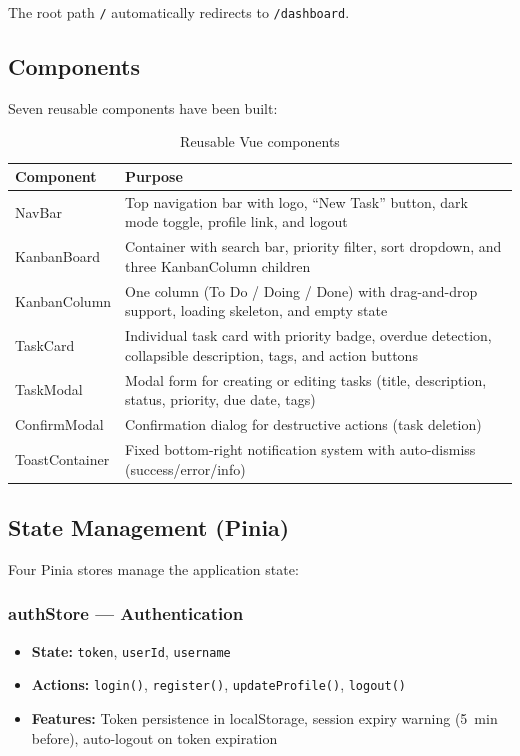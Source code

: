 \documentclass[12pt, a4paper]{article}
\begin{document}
The root path \texttt{/} automatically redirects to \texttt{/dashboard}.

\subsection{Components}

Seven reusable components have been built:

\begin{table}[H]
\centering
\begin{tabularx}{\textwidth}{lX}
\toprule
\textbf{Component} & \textbf{Purpose} \\
\midrule
NavBar         & Top navigation bar with logo, ``New Task'' button, dark mode toggle, profile link, and logout \\
KanbanBoard    & Container with search bar, priority filter, sort dropdown, and three KanbanColumn children \\
KanbanColumn   & One column (To Do / Doing / Done) with drag-and-drop support, loading skeleton, and empty state \\
TaskCard       & Individual task card with priority badge, overdue detection, collapsible description, tags, and action buttons \\
TaskModal      & Modal form for creating or editing tasks (title, description, status, priority, due date, tags) \\
ConfirmModal   & Confirmation dialog for destructive actions (task deletion) \\
ToastContainer & Fixed bottom-right notification system with auto-dismiss (success/error/info) \\
\bottomrule
\end{tabularx}
\caption{Reusable Vue components}
\end{table}

\subsection{State Management (Pinia)}

Four Pinia stores manage the application state:

\subsubsection{authStore --- Authentication}
\begin{itemize}[nosep]
    \item \textbf{State:} \texttt{token}, \texttt{userId}, \texttt{username}
    \item \textbf{Actions:} \texttt{login()}, \texttt{register()}, \texttt{updateProfile()}, \texttt{logout()}
    \item \textbf{Features:} Token persistence in localStorage, session expiry warning (5~min before), auto-logout on token expiration
\end{itemize}
\end{document}
